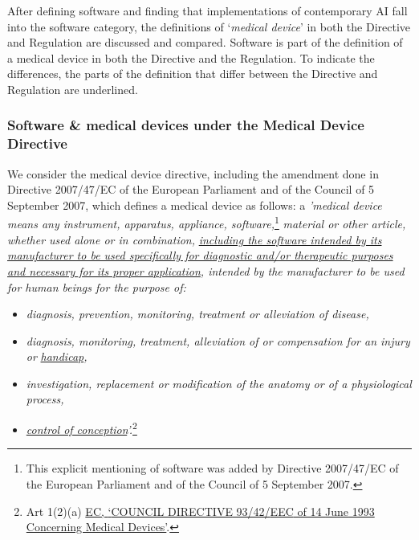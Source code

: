 \documentclass[
]{scrartcl}
\begin{document}
After defining software and finding that implementations of contemporary AI fall into the software category, the definitions of `\emph{medical device}' in both the Directive and Regulation are discussed and compared. Software is part of the definition of a medical device in both the Directive and the Regulation. To indicate the differences, the parts of the definition that differ between the Directive and Regulation are underlined.

\hypertarget{software-medical-devices-under-the-medical-device-directive}{%
\subsubsection{Software \& medical devices under the Medical Device Directive}\label{software-medical-devices-under-the-medical-device-directive}}

We consider the medical device directive, including the amendment done in Directive 2007/47/EC of the European Parliament and of the Council of 5 September 2007, which defines a medical device as follows: a \emph{'medical device means any instrument, apparatus, appliance, software,}\footnote{This explicit mentioning of software was added by Directive 2007/47/EC of the European Parliament and of the Council of 5 September 2007.} \emph{material or other article, whether used alone or in combination,} \emph{\underline{including the software intended by its manufacturer to be used specifically for diagnostic and/or therapeutic purposes and necessary for its proper application}, intended by the manufacturer to be used for human beings for the purpose of:}

\begin{itemize}
\item
  \emph{diagnosis, prevention, monitoring, treatment or alleviation of disease,}
\item
  \emph{diagnosis, monitoring, treatment, alleviation of or compensation for an injury or} \emph{\underline{handicap},}
\item
  \emph{investigation, replacement or modification of the anatomy or of a physiological process,}
\item
  \emph{\underline{control of conception}'.}\footnote{Art 1(2)(a) \protect\hyperlink{ref-ecCOUNCILDIRECTIVE931993}{EC, {`{COUNCIL DIRECTIVE} 93/42/{EEC} of 14 {June} 1993 Concerning Medical Devices'}}.}
\end{itemize}
\end{document}
